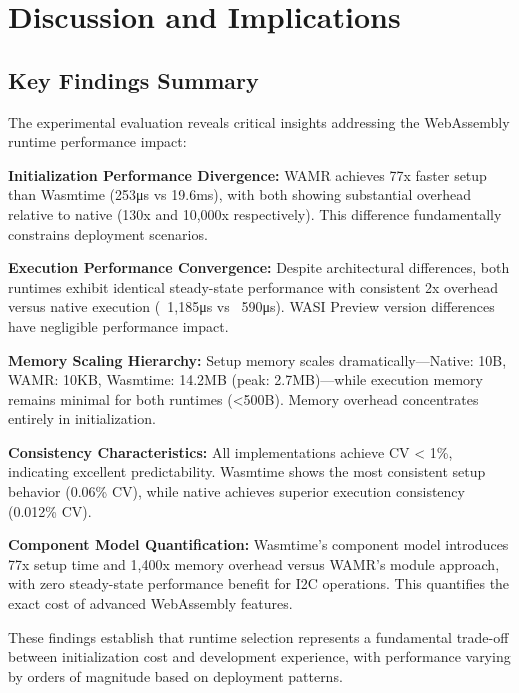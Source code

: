 \section{Discussion and Implications}
\label{sec:eval-discussion}

\subsection{Key Findings Summary}
\label{subsec:eval-discussion-keyfindings}

The experimental evaluation reveals critical insights addressing the WebAssembly runtime performance impact:

\textbf{Initialization Performance Divergence:}
WAMR achieves 77x faster setup than Wasmtime (253μs vs 19.6ms), with both showing substantial overhead relative to native (130x and 10,000x respectively). This difference fundamentally constrains deployment scenarios.

\textbf{Execution Performance Convergence:}  
Despite architectural differences, both runtimes exhibit identical steady-state performance with consistent 2x overhead versus native execution (~1,185μs vs ~590μs). WASI Preview version differences have negligible performance impact.

\textbf{Memory Scaling Hierarchy:}
Setup memory scales dramatically—Native: 10B, WAMR: 10KB, Wasmtime: 14.2MB (peak: 2.7MB)—while execution memory remains minimal for both runtimes (<500B). Memory overhead concentrates entirely in initialization.

\textbf{Consistency Characteristics:}
All implementations achieve CV < 1\%, indicating excellent predictability. Wasmtime shows the most consistent setup behavior (0.06\% CV), while native achieves superior execution consistency (0.012\% CV).

\textbf{Component Model Quantification:}
Wasmtime's component model introduces 77x setup time and 1,400x memory overhead versus WAMR's module approach, with zero steady-state performance benefit for I2C operations. This quantifies the exact cost of advanced WebAssembly features.

These findings establish that runtime selection represents a fundamental trade-off between initialization cost and development experience, with performance varying by orders of magnitude based on deployment patterns.


